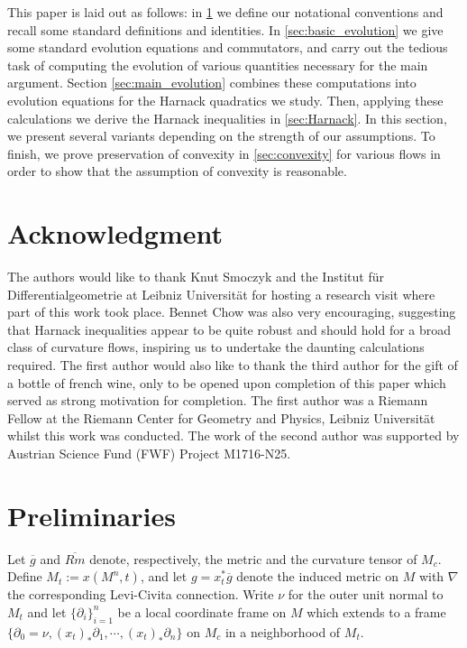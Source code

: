 \documentclass{amsart}
\begin{document}
This paper is laid out as follows: in \cref{sec:prelim} we define our notational conventions and recall some standard definitions and identities. In \cref{sec:basic_evolution} we give some standard evolution equations and commutators, and carry out the tedious task of computing the evolution of various quantities necessary for the main argument. Section \ref{sec:main_evolution} combines these computations into evolution equations for the Harnack quadratics we study. Then, applying these calculations we derive the Harnack inequalities in \cref{sec:Harnack}. In this section, we present several variants depending on the strength of our assumptions. To finish, we prove preservation of convexity in \cref{sec:convexity} for various flows in order to show that the assumption of convexity is reasonable.

\section*{Acknowledgment}

The authors would like to thank Knut Smoczyk and the Institut f\"{u}r Differentialgeometrie at Leibniz Universität for hosting a research visit where part of this work took place. Bennet Chow was also very encouraging, suggesting that Harnack inequalities appear to be quite robust and should hold for a broad class of curvature flows, inspiring us to undertake the daunting calculations required. The first author would also like to thank the third author for the gift of a bottle of french wine, only to be opened upon completion of this paper which served as strong motivation for completion. The first author was a Riemann Fellow at the Riemann Center for Geometry and Physics, Leibniz Universit\"{a}t whilst this work was conducted. The work of the second author was supported by Austrian Science Fund (FWF) Project M1716-N25. 

\section{Preliminaries}
\label{sec:prelim}

Let $\overline{g}$ and $\overline{Rm}$ denote, respectively, the metric and the curvature tensor of $M_c$. Define \(M_t := x(M^n,t)\), and let \(g = x_t^{\ast} \overline{g}\) denote the induced metric on \(M\) with $\nabla$ the corresponding Levi-Civita connection. Write $\nu$ for the outer unit normal to $M_t$ and let \(\{\partial_i\}_{i=1}^n\) be a local coordinate frame on \(M\) which extends to a frame \(\{\partial_0 = \nu, (x_t)_{\ast} \partial_1, \cdots, (x_t)_{\ast} \partial_n\}\) on \(M_c\) in a neighborhood of \(M_t\).
\end{document}
